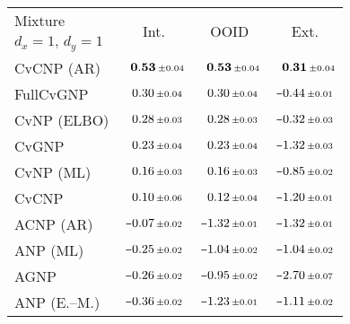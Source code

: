 \begin{tabular}[t]{lccc} 
\toprule 
Mixture & \multirow{2}{*}{Int.} & \multirow{2}{*}{OOID} & \multirow{2}{*}{Ext.} \\ 
$d_x\!=\!1,\,d_y\!=\!1$ \\ \midrule 
CvCNP (AR) & $\hphantom{\scalebox{0.7}[1]{$-$}}\mathbf{0.53}\,{ \scriptstyle \pm  0.04 }$ & $\hphantom{\scalebox{0.7}[1]{$-$}}\mathbf{0.53}\,{ \scriptstyle \pm  0.04 }$ & $\hphantom{\scalebox{0.7}[1]{$-$}}\mathbf{0.31}\,{ \scriptstyle \pm  0.04 }$ \\ 
FullCvGNP & $\hphantom{\scalebox{0.7}[1]{$-$}}0.30\,{ \scriptstyle \pm  0.04 }$ & $\hphantom{\scalebox{0.7}[1]{$-$}}0.30\,{ \scriptstyle \pm  0.04 }$ & $\scalebox{0.7}[1]{$-$}0.44\,{ \scriptstyle \pm  0.01 }$ \\ 
CvNP (ELBO) & $\hphantom{\scalebox{0.7}[1]{$-$}}0.28\,{ \scriptstyle \pm  0.03 }$ & $\hphantom{\scalebox{0.7}[1]{$-$}}0.28\,{ \scriptstyle \pm  0.03 }$ & $\scalebox{0.7}[1]{$-$}0.32\,{ \scriptstyle \pm  0.03 }$ \\ 
CvGNP & $\hphantom{\scalebox{0.7}[1]{$-$}}0.23\,{ \scriptstyle \pm  0.04 }$ & $\hphantom{\scalebox{0.7}[1]{$-$}}0.23\,{ \scriptstyle \pm  0.04 }$ & $\scalebox{0.7}[1]{$-$}1.32\,{ \scriptstyle \pm  0.03 }$ \\ 
CvNP (ML) & $\hphantom{\scalebox{0.7}[1]{$-$}}0.16\,{ \scriptstyle \pm  0.03 }$ & $\hphantom{\scalebox{0.7}[1]{$-$}}0.16\,{ \scriptstyle \pm  0.03 }$ & $\scalebox{0.7}[1]{$-$}0.85\,{ \scriptstyle \pm  0.02 }$ \\ 
CvCNP & $\hphantom{\scalebox{0.7}[1]{$-$}}0.10\,{ \scriptstyle \pm  0.06 }$ & $\hphantom{\scalebox{0.7}[1]{$-$}}0.12\,{ \scriptstyle \pm  0.04 }$ & $\scalebox{0.7}[1]{$-$}1.20\,{ \scriptstyle \pm  0.01 }$ \\ 
ACNP (AR) & $\scalebox{0.7}[1]{$-$}0.07\,{ \scriptstyle \pm  0.02 }$ & $\scalebox{0.7}[1]{$-$}1.32\,{ \scriptstyle \pm  0.01 }$ & $\scalebox{0.7}[1]{$-$}1.32\,{ \scriptstyle \pm  0.01 }$ \\ 
ANP (ML) & $\scalebox{0.7}[1]{$-$}0.25\,{ \scriptstyle \pm  0.02 }$ & $\scalebox{0.7}[1]{$-$}1.04\,{ \scriptstyle \pm  0.02 }$ & $\scalebox{0.7}[1]{$-$}1.04\,{ \scriptstyle \pm  0.02 }$ \\ 
AGNP & $\scalebox{0.7}[1]{$-$}0.26\,{ \scriptstyle \pm  0.02 }$ & $\scalebox{0.7}[1]{$-$}0.95\,{ \scriptstyle \pm  0.02 }$ & $\scalebox{0.7}[1]{$-$}2.70\,{ \scriptstyle \pm  0.07 }$ \\ 
ANP (E.--M.) & $\scalebox{0.7}[1]{$-$}0.36\,{ \scriptstyle \pm  0.02 }$ & $\scalebox{0.7}[1]{$-$}1.23\,{ \scriptstyle \pm  0.01 }$ & $\scalebox{0.7}[1]{$-$}1.11\,{ \scriptstyle \pm  0.02 }$ \\ 

\end{tabular}
